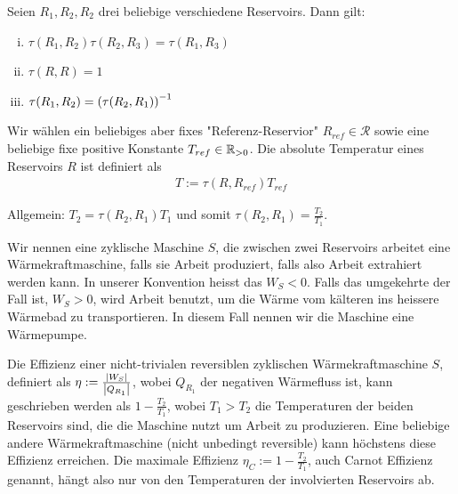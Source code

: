 \begin{lemma}
    Seien $R_1,R_2,R_2$ drei beliebige verschiedene Reservoirs. Dann gilt:
    \begin{enumerate}[(i)]
        \item $\tau(R_1,R_2) \tau(R_2,R_3) = \tau(R_1,R_3)$
        \item $\tau(R,R) = 1$
        \item $\tau(R_1,R_2) = \left( \tau(R_2,R_1) \right)^{-1}$
    \end{enumerate}
\end{lemma}

\begin{definition}
    Wir wählen ein beliebiges aber fixes "Referenz-Reservior" $R_{ref} \in
    \mathcal{R}$ sowie eine beliebige fixe positive Konstante $T_{ref} \in
    \mathbb{R}_{>0}$. Die absolute Temperatur eines Reservoirs $R$ ist definiert als
    \begin{align*}
        T := \tau(R,R_{ref}) T_{ref}
    \end{align*}
\end{definition}

\begin{lemma}
    Allgemein: $T_2 = \tau(R_2,R_1)T_1$ und somit
    $\tau(R_2,R_1) = \frac{T_2}{T_1}$.
\end{lemma}

\begin{definition}
    Wir nennen eine zyklische Maschine $S$, die zwischen zwei Reservoirs
    arbeitet eine Wärmekraftmaschine, falls sie Arbeit produziert, falls also
    Arbeit extrahiert werden kann. In unserer Konvention heisst das $W_S < 0$. Falls das
    umgekehrte der Fall ist, $W_S > 0$, wird Arbeit benutzt, um die Wärme vom
    kälteren ins heissere Wärmebad zu transportieren. In diesem Fall nennen
    wir die Maschine eine Wärmepumpe.
\end{definition}

\begin{definition}
    Die Effizienz einer nicht-trivialen reversiblen zyklischen Wärmekraftmaschine
    $S$, definiert als $\eta := \frac{\left\vert W_S \right\vert}{\left\vert Q_{R_1} \right\vert}$, wobei $Q_{R_1}$
    der negativen Wärmefluss ist, kann geschrieben werden als $1 - \frac{T_2}{T_1}$,
    wobei $T_1 > T_2$ die Temperaturen der beiden Reservoirs sind, die die
    Maschine nutzt um Arbeit zu produzieren. Eine beliebige andere
    Wärmekraftmaschine (nicht unbedingt reversible) kann höchstens diese
    Effizienz erreichen. Die maximale Effizienz $\eta_C := 1 - \frac{T_2}{T_1}$,
    auch Carnot Effizienz genannt, hängt also nur von den Temperaturen der
    involvierten Reservoirs ab.
\end{definition}

